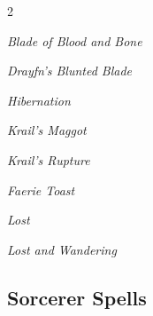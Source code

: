 \documentclass[10pt,a4paper,twoside,bg=print,twocolumn,openany,nodeprecatedcode]{dndbook}
\begin{document}
\begin{description}
\begin{multicols}{2}
{\par \vspace { 9pt plus 3pt minus 3pt } \noindent  {} \nopagebreak }

\begin{description}
\item \textit{Blade of Blood and Bone}
\end{description}

{\par \vspace { 9pt plus 3pt minus 3pt } \noindent  {} \nopagebreak }

\begin{description}
\item \textit{Drayfn's Blunted Blade}
\item \textit{Hibernation}
\item \textit{Krail's Maggot}
\item \textit{Krail's Rupture}
\end{description}

{\par \vspace { 9pt plus 3pt minus 3pt } \noindent  {} \nopagebreak }

\begin{description}
\item \textit{Faerie Toast}
\item \textit{Lost}
\end{description}

{\par \vspace { 9pt plus 3pt minus 3pt } \noindent  {} \nopagebreak }

\begin{description}
\item \textit{Lost and Wandering}
\end{description}

\end{multicols}

\end{description}

\subsection{Sorcerer Spells}
\end{document}
